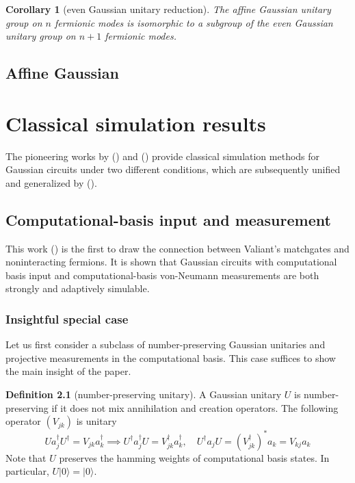 \documentclass[
]{book}
\newtheorem{corollary}{Corollary}[chapter]
\theoremstyle{definition}
\newtheorem{definition}{Definition}[chapter]
\theoremstyle{definition}
\theoremstyle{definition}
\theoremstyle{definition}
\theoremstyle{remark}
\begin{document}
\begin{corollary}[even Gaussian unitary reduction]
\protect\hypertarget{cor:evenReductionCor}{}\label{cor:evenReductionCor}The affine Gaussian unitary group on \(n\) fermionic modes is isomorphic to
a subgroup of the even Gaussian unitary group on \(n+1\) fermionic modes.
\end{corollary}

\section{Affine Gaussian}\label{affine-gaussian}

\chapter{Classical simulation results}\label{classical-simulation-results}

The pioneering works by () and
() provide classical simulation
methods for Gaussian circuits under two different conditions,
which are subsequently unified and generalized by ().

\section{Computational-basis input and measurement}\label{computational-basis-input-and-measurement}

This work () is the first to draw the connection
between Valiant's matchgates and noninteracting fermions.
It is shown that Gaussian circuits
with computational basis input and computational-basis von-Neumann measurements
are both strongly and adaptively simulable.

\subsection{Insightful special case}\label{insightful-special-case}

Let us first consider a subclass of number-preserving Gaussian unitaries
and projective measurements in the computational basis.
This case suffices to show the main insight of the paper.

\begin{definition}[number-preserving unitary]
\protect\hypertarget{def:npunitary}{}\label{def:npunitary}A Gaussian unitary \(U\) is number-preserving if it does not mix annihilation
and creation operators. The following operator \((V_{jk})\) is unitary
\[ 
    U a_j^\dagger U^\dagger= V_{jk} a_k^\dagger\implies 
    U^\dagger a_j^\dagger U = V^\dagger_{jk} a_k^\dagger, \quad U^\dagger a_j 
    U = (V_{jk}^\dagger)^* a_k = V_{kj} a_k
\]
Note that \(U\) preserves the hamming weights of computational basis states.
In particular, \(U|0\rangle= |0\rangle\).
\end{definition}
\end{document}
